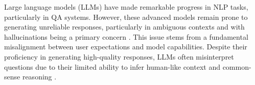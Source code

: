 



Large language models (LLMs) have made remarkable progress in NLP tasks, particularly in QA systems. However, these advanced models remain prone to generating unreliable responses, particularly in ambiguous contexts and with hallucinations being a primary concern \cite{ji-etal-2023-towards}. This issue stems from a fundamental misalignment between user expectations and model capabilities. %
Despite their proficiency in generating high-quality responses, LLMs often misinterpret questions due to their limited ability to infer human-like context and common-sense reasoning \cite{banerjee2024llms}.

